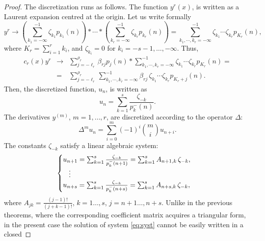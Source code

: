\documentclass[10pt]{amsart}
\numberwithin{equation}{section}
\theoremstyle{definition}
\begin{document}
\begin{proof}
\label{eq:8.23}
The discretization runs as follows. The function $y^{r}(x)$, is written
as a Laurent expansion centred at the origin. Let us write formally
\begin{equation}
y^{r}\to \left (\sum _{k_{1}=-\infty}^{-1}\zeta _{k_{1}} p_{k_{1}}(n)
\right )*\cdots * \left (\sum _{k_{r}=-\infty}^{-1}\zeta _{k_{r}} p_{k_{r}}(n)
\right )= \sum _{k_{1},\cdots ,k_{r}=-\infty}^{-1}\zeta _{k_{1}}
\cdots \zeta _{k_{r}}p_{K_{r}}(n),
\label{eq8.16}
\end{equation}
where $K_{r}=\sum _{i=1}^{r} k_{i}$, and $\zeta _{k_{i}}=0$ for
$k_{i}=-s-1,\ldots , -\infty $. Thus,
\begin{eqnarray}
c_{r}(x) y^{r} &\to & \sum _{j=-\ell _{r}}^{\rho _{r}}\beta _{rj} p_{j}(n)*
\sum _{k_{1},\cdots ,k_{r}=-\infty}^{-1}\zeta _{k_{1}}\cdots \zeta _{k_{r}}p_{K_{r}}(n)
=
\label{eq8.17}
\\
\nonumber
&=&\sum _{j=-\ell _{r}}^{\rho _{r}} \sum _{k_{1},\cdots ,k_{r}=-
\infty}^{-1} \beta _{rj} \, \zeta _{k_{1}}\cdots \zeta _{k_{r}}p_{K_{r}+j}(n).
\end{eqnarray}
Then, the discretized function, $u_{n}$, is written as
\begin{equation}
u_{n}=\sum _{k=1}^{s}\frac{\zeta _{-k}}{p^{-}_{k}(n)}.
\label{eq8.18}
\end{equation}
The derivatives $y^{(m)}$, $m=1,\ldots , r$, are discretized according
to the operator $\Delta $:
\begin{equation}
\Delta ^{m} u_{n}=\sum _{i=0}^{m}(-1)^{i}\binom{m}{i}u_{n+i}.
\label{eq8.19}
\end{equation}
The constants $\zeta _{-k}$ satisfy a linear algebraic system:
\begin{equation}
\label{eq:syst}
\begin{cases}
u_{n+1} = \sum _{k=1}^{s}\frac{\zeta _{-k}}{p^{-}_{k}(n+1)}= \sum _{k=1}^{s}
A_{n+1,k}\,\zeta _{-k},
\\
\hspace{3mm}
\vdots
\\
u_{n+s} = \sum _{k=1}^{s}\frac{\zeta _{-k}}{p^{-}_{k}(n+s)}= \sum _{k=1}^{s}
A_{n+s,k}\,\zeta _{-k},
\end{cases}
\end{equation}
where $A_{j k}=\frac{(j-1)!}{(j+k-1)!}$, $k=1\ldots ,s$,
$j=n+1\ldots ,n+s$. Unlike in the previous theorems, where the corresponding
coefficient matrix acquires a triangular form, in the present case the
solution of system  \eqref{eq:syst} cannot be easily written in a closed

\end{proof}
\end{document}
